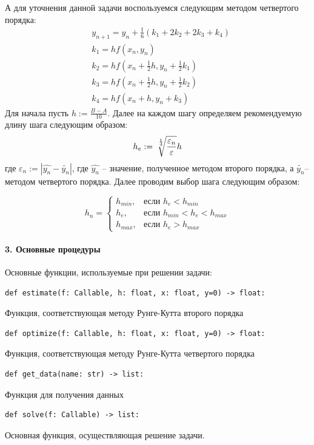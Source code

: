 \documentclass[11pt,a4paper]{report}
\begin{document}
А для уточнения данной задачи воспользуемся следующим методом четвертого порядка:
\[
\begin{aligned}
&y_{n+1} = y_n + \frac{1}{6}(k_1 + 2k_2 + 2k_3 + k_4)\\
&k_1 = hf(x_n,y_n)\\
&k_2 = hf(x_n + \frac{1}{2}h, y_n + \frac{1}{2}k_1)\\
&k_3 = hf(x_n + \frac{1}{2}h, y_n + \frac{1}{2}k_2)\\
&k_4 = hf(x_n + h, y_n + k_3)
\end{aligned}
\]
Для начала пусть $ h := \frac{B - A}{10} $. Далее на каждом шагу определяем рекомендуемую длину шага следующим образом:
\[
h_e := \sqrt[\leftroot{-2}\uproot{5}\frac{1}{4}]{\frac{\varepsilon_n}{\varepsilon}}h
\]
где $ \varepsilon_n := |\hat{y_n} - \tilde{y_n} | $, где $\hat{y_n}$ -- значение, полученное методом второго порядка, а $\tilde{y_n}$-- методом четвертого порядка. Далее проводим выбор шага следующим образом:

\[
h_n = \begin{cases}
	h_{min}, & \text{если $h_e < h_{min}$} \\
	h_e, & \text{если $h_{min} < h_e < h_{max}$} \\
	h_{max}, & \text{если $h_e > h_{max}$}
\end{cases}
\]

\paragraph{3. Основные процедуры}
Основные функции, используемые при решении задачи:


\begin{lstlisting}
def estimate(f: Callable, h: float, x: float, y=0) -> float:
\end{lstlisting}
Функция, соответствующая методу Рунге-Кутта второго порядка
\begin{lstlisting}
def optimize(f: Callable, h: float, x: float, y=0) -> float:
\end{lstlisting}
Функция, соответствующая методу Рунге-Кутта четвертого порядка
\begin{lstlisting}
def get_data(name: str) -> list:
\end{lstlisting}
Функция для получения данных
\begin{lstlisting}
def solve(f: Callable) -> list:
\end{lstlisting}
Основная функция, осуществляющая решение задачи.
\end{document}
